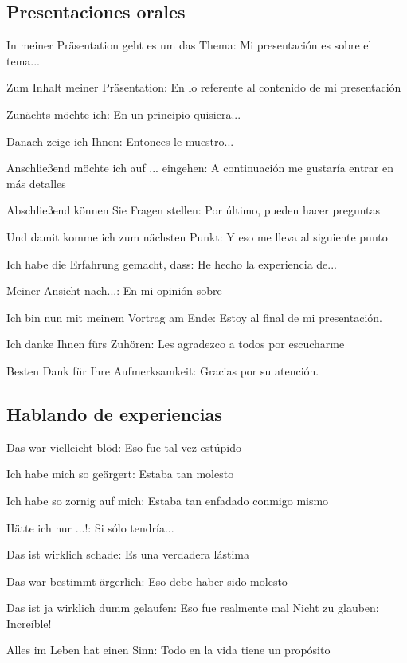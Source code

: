 \subsection{Presentaciones orales}
\begin{myitemize}
\item In meiner Präsentation geht es um das Thema: Mi presentación es sobre el tema...
\item Zum Inhalt meiner Präsentation: En lo referente al contenido de mi presentación
\item Zunächts möchte ich: En un principio quisiera...
\item Danach zeige ich Ihnen: Entonces le muestro...
\item Anschließend möchte ich auf ... eingehen: A continuación me gustaría entrar en más detalles
\item Abschließend können Sie Fragen stellen: Por último, pueden hacer preguntas
\item Und damit komme ich zum nächsten Punkt: Y eso me lleva al siguiente punto
\item Ich habe die Erfahrung gemacht, dass: He hecho la experiencia de... 
\item Meiner Ansicht nach...: En mi opinión sobre
\item Ich bin nun mit meinem Vortrag am Ende: Estoy al final de mi presentación.
\item Ich danke Ihnen fürs Zuhören: Les agradezco a todos por escucharme
\item Besten Dank für Ihre Aufmerksamkeit: Gracias por su atención. 
\end{myitemize}

\subsection{Hablando de experiencias}
\begin{myitemize}
\item Das war vielleicht blöd: Eso fue tal vez estúpido
\item Ich habe mich so geärgert: Estaba tan molesto
\item Ich habe so zornig auf mich: Estaba tan enfadado conmigo mismo
\item Hätte ich nur ...!: Si sólo tendría...
\item Das ist wirklich schade: Es una verdadera lástima
\item Das war bestimmt ärgerlich: Eso debe haber sido molesto
\item Das ist ja wirklich dumm gelaufen: Eso fue realmente mal
\text Nicht zu glauben: Increíble!
\item Alles im Leben hat einen Sinn: Todo en la vida tiene un propósito
\end{myitemize}

